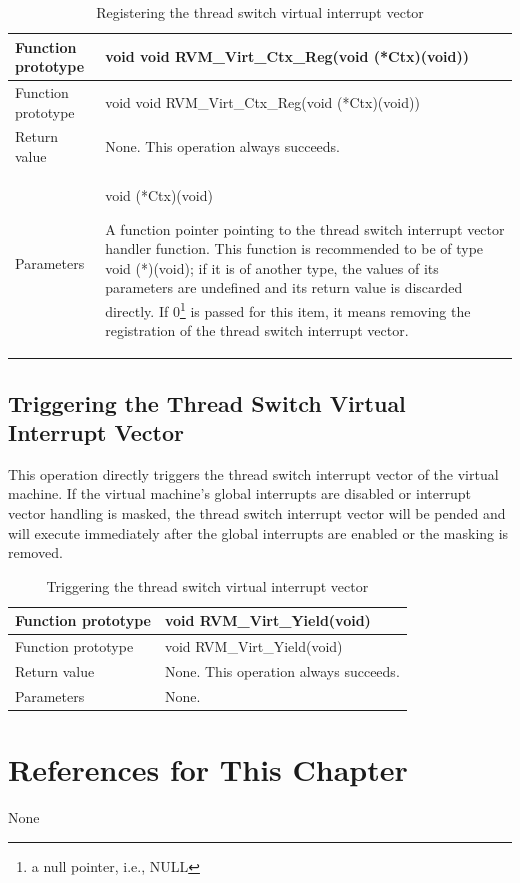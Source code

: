 \begin{xltabular}{\textwidth}{@{}>{\hsize\raggedright\arraybackslash}X>{\hsize\raggedright\arraybackslash}X@{}}
\caption{Registering the thread switch virtual interrupt vector}\label{tab:4-25}\\
\toprule
Function prototype & void void RVM\_\allowbreak{}Virt\_\allowbreak{}Ctx\_\allowbreak{}Reg(void
(*Ctx)(void))\tabularnewline
\endfirsthead
\toprule
Function prototype & void void RVM\_\allowbreak{}Virt\_\allowbreak{}Ctx\_\allowbreak{}Reg(void
(*Ctx)(void))\tabularnewline
\midrule
\endhead
\bottomrule
\endlastfoot
Return value & None. This operation always succeeds.\tabularnewline
Parameters\strut
 & void (*Ctx)(void)

A function pointer pointing to the thread switch interrupt vector handler function. This function is recommended to be of type void
(*)(void); if it is of another type, the values of its parameters are undefined and its return value is discarded directly. If 0\footnote{a null pointer, i.e., NULL} is passed for this item, it means removing the registration of the thread switch interrupt vector.\strut
\tabularnewline
\end{xltabular}

\subsection{Triggering the Thread Switch Virtual Interrupt Vector}\label{subsec:4-5-8}

This operation directly triggers the thread switch interrupt vector of the virtual machine. If the virtual machine's global interrupts are disabled or interrupt vector handling is masked, the thread switch interrupt vector will be pended and will execute immediately after the global interrupts are enabled or the masking is removed.

\begin{xltabular}{\textwidth}{@{}>{\hsize\raggedright\arraybackslash}X>{\hsize\raggedright\arraybackslash}X@{}}
\caption{Triggering the thread switch virtual interrupt vector}\label{tab:4-26}\\
\toprule
Function prototype & void RVM\_\allowbreak{}Virt\_\allowbreak{}Yield(void)\tabularnewline
\endfirsthead
\toprule
Function prototype & void RVM\_\allowbreak{}Virt\_\allowbreak{}Yield(void)\tabularnewline
\midrule
\endhead
\bottomrule
\endlastfoot
Return value & None. This operation always succeeds.\tabularnewline
Parameters & None.\tabularnewline
\end{xltabular}

\section{References for This Chapter}\label{sec:4-6}

None

